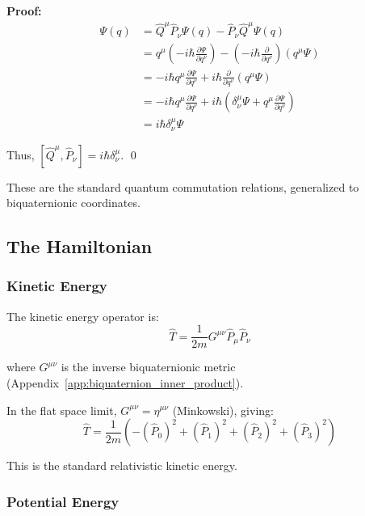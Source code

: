 \textbf{Proof:}
\begin{align}
[\hat{Q}^{\mu}, \hat{P}_{\nu}] \Psi(q) &= \hat{Q}^{\mu} \hat{P}_{\nu} \Psi(q) - \hat{P}_{\nu} \hat{Q}^{\mu} \Psi(q) \\
&= q^{\mu} \left(-i\hbar \frac{\partial \Psi}{\partial q^{\nu}}\right) - \left(-i\hbar \frac{\partial}{\partial q^{\nu}}\right)(q^{\mu} \Psi) \\
&= -i\hbar q^{\mu} \frac{\partial \Psi}{\partial q^{\nu}} + i\hbar \frac{\partial}{\partial q^{\nu}}(q^{\mu} \Psi) \\
&= -i\hbar q^{\mu} \frac{\partial \Psi}{\partial q^{\nu}} + i\hbar \left(\delta^{\mu}_{\nu} \Psi + q^{\mu} \frac{\partial \Psi}{\partial q^{\nu}}\right) \\
&= i\hbar \delta^{\mu}_{\nu} \Psi
\end{align}

Thus, $[\hat{Q}^{\mu}, \hat{P}_{\nu}] = i\hbar \delta^{\mu}_{\nu}$. \qed

These are the standard quantum commutation relations, generalized to biquaternionic coordinates.

\subsection{The Hamiltonian}

\subsubsection{Kinetic Energy}

The kinetic energy operator is:
\begin{equation}
\hat{T} = \frac{1}{2m} G^{\mu\nu} \hat{P}_{\mu} \hat{P}_{\nu}
\end{equation}

where $G^{\mu\nu}$ is the inverse biquaternionic metric (Appendix~\ref{app:biquaternion_inner_product}).

In the flat space limit, $G^{\mu\nu} = \eta^{\mu\nu}$ (Minkowski), giving:
\begin{equation}
\hat{T} = \frac{1}{2m} \left(-(\hat{P}_0)^2 + (\hat{P}_1)^2 + (\hat{P}_2)^2 + (\hat{P}_3)^2\right)
\end{equation}

This is the standard relativistic kinetic energy.

\subsubsection{Potential Energy}

